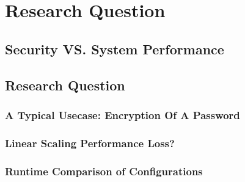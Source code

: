 \chapter{Research Question}

\section{Security VS. System Performance}

\section{Research Question}

\subsection{A Typical Usecase: Encryption Of A Password}

\subsection{Linear Scaling Performance Loss?}

\subsection{Runtime Comparison of Configurations}

